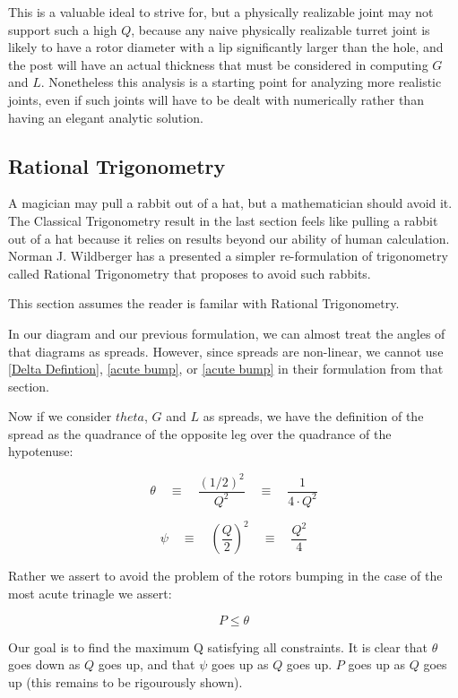 \documentclass[11pt]{article}
\begin{document}
This is a valuable ideal to strive for, but a physically realizable joint may not support such a high $Q$,
because any naive physically realizable
turret joint is likely to have a rotor diameter with a lip significantly larger than the hole, and the post will have an actual
thickness that must be considered in computing $G$ and $L$. Nonetheless this analysis is a starting point for analyzing more
realistic joints, even if such joints will have to be dealt with numerically rather than having an elegant analytic solution.

\label{rationalphiproof}

\subsection{Rational Trigonometry}

A magician may pull a rabbit out of a hat, but a mathematician should avoid it.
The Classical Trigonometry result in the last section feels like pulling a rabbit out of a hat because it relies
on results beyond our ability of human calculation.  Norman J. Wildberger has a presented a simpler re-formulation
of trigonometry called Rational Trigonometry\cite{wildberger2005} that proposes to avoid such rabbits.

This section assumes the reader is familar with Rational Trigonometry.

In our diagram and our previous formulation, we can almost treat the angles of that diagrams as spreads. However,
since spreads are non-linear, we cannot use \ref{Delta Defintion}, \ref{acute bump}, or \ref{acute bump} in their
formulation from that section.


Now if we consider $theta$, $G$ and $L$ as spreads, we have the definition of the spread as the quadrance of the
opposite leg over the quadrance of the hypotenuse:


\[ \tag{rational-theta} \theta \quad \equiv \quad \frac{(1/2)^2}{Q^2} \quad \equiv \quad \frac{1}{4 \cdot Q^2}  \]

\[ \tag{rational-psi} \psi \quad \equiv \quad (\frac{Q}{2})^2 \quad \equiv \quad \frac{Q^2}{4}  \]


Rather we assert to avoid the problem of the rotors bumping in the case of the most acute trinagle we assert:

\[ \tag{rational acute bump} P \leq \theta  \]

Our goal is to find the maximum Q satisfying all constraints.  It is clear that $\theta$ goes down as $Q$ goes
up, and that $\psi$ goes up as $Q$ goes up.  $P$ goes up as $Q$ goes up (this remains to be rigourously shown).
\end{document}
